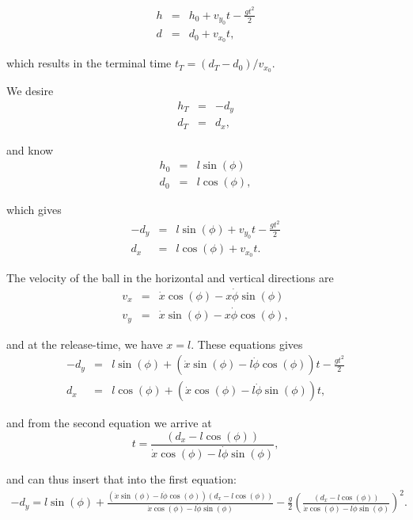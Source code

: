 \begin{eqnarray*}
h & = & h_{0}+v_{y_{0}}t-\frac{gt^{2}}{2}\\
d & = & d_{0}+v_{x_{0}}t,
\end{eqnarray*}


which results in the terminal time $t_{T}=(d_{T}-d_{0})/v_{x_{0}}$.

We desire 
\begin{eqnarray*}
h_{T} & = & -d_{y}\\
d_{T} & = & d_{x},
\end{eqnarray*}


and know
\begin{eqnarray*}
h_{0} & = & l\sin(\phi)\\
d_{0} & = & l\cos(\phi),
\end{eqnarray*}


which gives
\begin{eqnarray*}
-d_{y} & = & l\sin(\phi)+v_{y_{0}}t-\frac{gt^{2}}{2}\\
d_{x} & = & l\cos(\phi)+v_{x_{0}}t.
\end{eqnarray*}


The velocity of the ball in the horizontal and vertical directions
are
\begin{eqnarray*}
v_{x} & = & \dot{x}\cos(\phi)-x\dot{\phi}\sin(\phi)\\
v_{y} & = & \dot{x}\sin(\phi)-x\dot{\phi}\cos(\phi),
\end{eqnarray*}


and at the release-time, we have $x=l$. These equations gives
\begin{eqnarray*}
-d_{y} & = & l\sin(\phi)+\left(\dot{x}\sin(\phi)-l\dot{\phi}\cos(\phi)\right)t-\frac{gt^{2}}{2}\\
d_{x} & = & l\cos(\phi)+\left(\dot{x}\cos(\phi)-l\dot{\phi}\sin(\phi)\right)t,
\end{eqnarray*}


and from the second equation we arrive at 
\[
t=\frac{\left(d_{x}-l\cos(\phi)\right)}{\dot{x}\cos(\phi)-l\dot{\phi}\sin(\phi)},
\]


and can thus insert that into the first equation:
\begin{gather*}
-d_{y}=l\sin(\phi)+\frac{\left(\dot{x}\sin(\phi)-l\dot{\phi}\cos(\phi)\right)\left(d_{x}-l\cos(\phi)\right)}{\dot{x}\cos(\phi)-l\dot{\phi}\sin(\phi)}-\frac{g}{2}\left(\frac{\left(d_{x}-l\cos(\phi)\right)}{\dot{x}\cos(\phi)-l\dot{\phi}\sin(\phi)}\right)^{2}.
\end{gather*}



